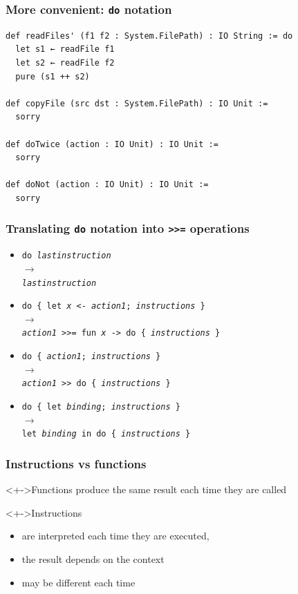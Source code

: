 \documentclass{beamer}
\begin{document}
\begin{frame}[fragile]
  \frametitle{More convenient: \texttt{do} notation}
\begin{lstlisting}
def readFiles' (f1 f2 : System.FilePath) : IO String := do
  let s1 ← readFile f1
  let s2 ← readFile f2
  pure (s1 ++ s2)

def copyFile (src dst : System.FilePath) : IO Unit :=
  sorry

def doTwice (action : IO Unit) : IO Unit :=
  sorry

def doNot (action : IO Unit) : IO Unit :=
  sorry
\end{lstlisting}
\end{frame}
\begin{frame}
  \frametitle{Translating \texttt{do} notation into \texttt{>>=} operations}
  \begin{itemize}
  \item \texttt{do \emph{lastinstruction}}
    \\ $\longrightarrow$
    \\ \texttt{\emph{lastinstruction}}
    \\[2ex]
  \item \texttt{do \{ let \emph{x} <- \emph{action1}; \emph{instructions} \}}
    \\ $\longrightarrow$
    \\ \texttt{\emph{action1} >>= fun \emph{x} -> \texttt{do \{ \emph{instructions} \}}}
    \\[2ex]
  \item \texttt{do \{ \emph{action1}; \emph{instructions} \}}
    \\ $\longrightarrow$
    \\ \texttt{\emph{action1} >> \texttt{do \{ \emph{instructions} \}}}
    \\[2ex]
  \item \texttt{do \{ let \emph{binding}; \emph{instructions} \}}
    \\ $\longrightarrow$
    \\ \texttt{let \emph{binding} in do \{  \emph{instructions} \}}
  \end{itemize}
\end{frame}
\begin{frame}[fragile]
  \frametitle{Instructions vs functions}
  \begin{block}<+->{Functions}
    produce the same result each time they are called
  \end{block}
  \begin{block}<+->{Instructions}
    \begin{itemize}
    \item are interpreted each time they are executed,
    \item the result depends on the context
    \item may be different each time
    \end{itemize}
  \end{block}
\end{frame}
\end{document}
